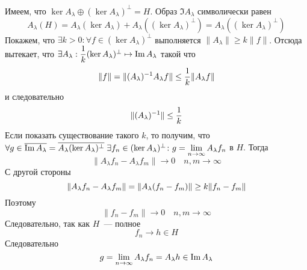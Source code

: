 \documentclass[14pt]{extarticle}
\begin{document}
\begin{Proof}
    Имеем, что $\ker A_\lambda \oplus (\ker A_\lambda)^\perp = H$.
    Образ $\Im A_\lambda$ символически равен
    $$
    A_\lambda(H) = A_\lambda(\ker A_\lambda) + A_\lambda((\ker A_\lambda)^
    \perp) = A_\lambda((\ker A_\lambda)^\perp)
    $$
    Покажем, что $\exists k > 0\colon \forall f \in (\ker A_\lambda)^\perp$
    выполняется $\|A_\lambda\| \ge k \|f\|$.
    Отсюда вытекает, что $\exists \Al : \dfrac{1}{k}(\ker A_\lambda)^\perp 
    \mapsto \Im 
    \Al$ такой что
    $$
    \|f\| = \|\Alo \Al f\| \le \dfrac{1}{k}\|\Al f\|
    $$
    и следовательно
    $$
    \|(A_\lambda)^{-1}\| \le \dfrac{1}{k}
    $$
    Если показать существование такого $k$, то получим, что $\forall g \in 
    \overline{\Im \Al} = \overline{\Al (\ker A_\lambda)^\perp}\; \exists f_n
    \in (\ker A_\lambda)^\perp\colon g = \lim\limits_{n \to \infty}\Al f_n$ в
    $H$.
    Тогда
    $$
    \|A_\lambda f_n - A_\lambda f_m\| \to 0 \quad n,m \to \infty
    $$
    С другой стороны
    $$
    \|\Al f_n - \Al f_m\| = \| \Al (f_n - f_m)\| \ge k \|f_n - f_m\|
    $$
    Поэтому
    $$
    \|f_n - f_m\| \to 0 \quad n,m \to \infty
    $$
    Следовательно, так как $H$~--- полное
    $$
    f_n \to h \in H
    $$
    Следовательно
    $$
    g = \lim_{n \to \infty}\Al f_n = \Al h \in \Im \Al
    $$
    

\end{Proof}
\end{document}
